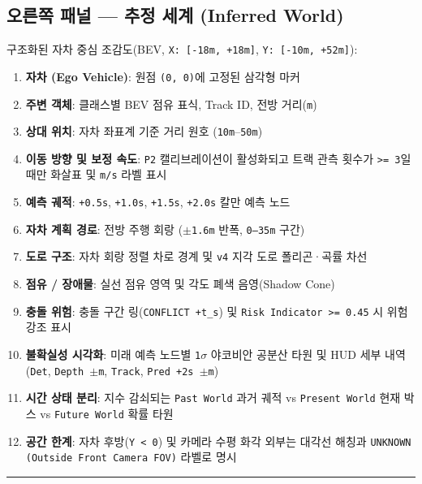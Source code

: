 \documentclass[10.5pt,a4paper]{article}
\begin{document}
\subsection{오른쪽 패널 --- 추정 세계 (Inferred World)}
구조화된 자차 중심 조감도(BEV, \texttt{X:\allowbreak{} [-\allowbreak{}18m,\allowbreak{} +18m]}, \texttt{Y:\allowbreak{} [-\allowbreak{}10m,\allowbreak{} +52m]}):

\begin{enumerate}[leftmargin=1.8em,itemsep=2pt]
\item \textbf{자차 (Ego Vehicle)}: 원점 \texttt{(0,\allowbreak{} 0)}에 고정된 삼각형 마커
\item \textbf{주변 객체}: 클래스별 BEV 점유 표식, Track ID, 전방 거리(\texttt{m})
\item \textbf{상대 위치}: 자차 좌표계 기준 거리 원호 (\texttt{10m}--\texttt{50m})
\item \textbf{이동 방향 및 보정 속도}: \texttt{P2} 캘리브레이션이 활성화되고 트랙 관측 횟수가 \texttt{>= 3}일 때만 화살표 및 \texttt{m/\allowbreak{}s} 라벨 표시
\item \textbf{예측 궤적}: \texttt{+0.\allowbreak{}5s}, \texttt{+1.\allowbreak{}0s}, \texttt{+1.\allowbreak{}5s}, \texttt{+2.\allowbreak{}0s} 칼만 예측 노드
\item \textbf{자차 계획 경로}: 전방 주행 회랑 (\texttt{$\pm$1.\allowbreak{}6m} 반폭, \texttt{0--35m} 구간)
\item \textbf{도로 구조}: 자차 회랑 정렬 차로 경계 및 \texttt{v4} 지각 도로 폴리곤·곡률 차선
\item \textbf{점유 / 장애물}: 실선 점유 영역 및 각도 폐색 음영(Shadow Cone)
\item \textbf{충돌 위험}: 충돌 구간 링(\texttt{CONFLICT +t\_\allowbreak{}s}) 및 \texttt{Risk Indicator >= 0.\allowbreak{}45} 시 위험 강조 표시
\item \textbf{불확실성 시각화}: 미래 예측 노드별 \texttt{1$\sigma$} 야코비안 공분산 타원 및 HUD 세부 내역(\texttt{Det}, \texttt{Depth $\pm$m}, \texttt{Track}, \texttt{Pred +2s $\pm$m})
\item \textbf{시간 상태 분리}: 지수 감쇠되는 \texttt{Past World} 과거 궤적 vs \texttt{Present World} 현재 박스 vs \texttt{Future World} 확률 타원
\item \textbf{공간 한계}: 자차 후방(\texttt{Y < 0}) 및 카메라 수평 화각 외부는 대각선 해칭과 \texttt{UNKNOWN (Outside Front Camera FOV)} 라벨로 명시
\end{enumerate}

\par\noindent\rule{\textwidth}{0.4pt}\par\medskip
\end{document}
